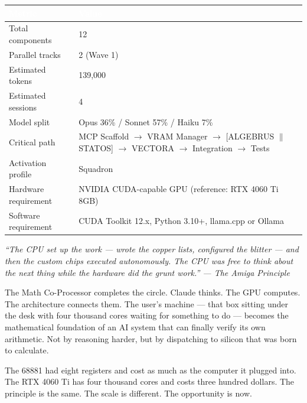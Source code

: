 \documentclass[11pt,letterpaper]{article}
\newcommand{\tableheader}[1]{\textbf{\sffamily\textcolor{white}{#1}}}
\begin{document}
\begin{center}
\begin{tabularx}{\textwidth}{L{4cm}X}
\toprule
{}
\tableheader{Metric} & \tableheader{Value} \\
\midrule
Total components & 12 \\
Parallel tracks & 2 (Wave 1) \\
Estimated tokens & 139,000 \\
Estimated sessions & 4 \\
Model split & Opus 36\% / Sonnet 57\% / Haiku 7\% \\
Critical path & MCP Scaffold $\rightarrow$ VRAM Manager $\rightarrow$ [ALGEBRUS $\|$ STATOS] $\rightarrow$ VECTORA $\rightarrow$ Integration $\rightarrow$ Tests \\
Activation profile & Squadron \\
Hardware requirement & NVIDIA CUDA-capable GPU (reference: RTX 4060 Ti 8GB) \\
Software requirement & CUDA Toolkit 12.x, Python 3.10+, llama.cpp or Ollama \\
\bottomrule
\end{tabularx}
\end{center}

\vspace{1cm}

\begin{quotebox}
\textit{``The CPU set up the work --- wrote the copper lists, configured the blitter --- and then the custom chips executed autonomously. The CPU was free to think about the next thing while the hardware did the grunt work.'' --- The Amiga Principle}

\vspace{0.5em}

The Math Co-Processor completes the circle. Claude thinks. The GPU computes. The architecture connects them. The user's machine --- that box sitting under the desk with four thousand cores waiting for something to do --- becomes the mathematical foundation of an AI system that can finally verify its own arithmetic. Not by reasoning harder, but by dispatching to silicon that was born to calculate.

\vspace{0.5em}

The 68881 had eight registers and cost as much as the computer it plugged into. The RTX 4060 Ti has four thousand cores and costs three hundred dollars. The principle is the same. The scale is different. The opportunity is now.
\end{quotebox}
\end{document}

